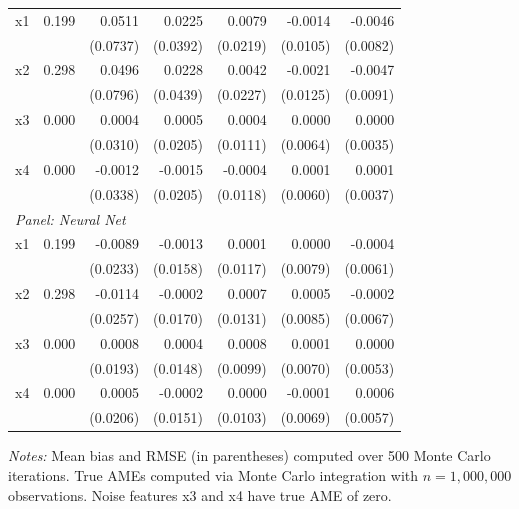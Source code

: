 \begin{table}[htbp]
\begin{threeparttable}
\begin{tabular}{lrrrrrr}
\quad x1 & 0.199 & 0.0511 & 0.0225 & 0.0079 & -0.0014 & -0.0046 \\
 &  & (0.0737) & (0.0392) & (0.0219) & (0.0105) & (0.0082) \\
\quad x2 & 0.298 & 0.0496 & 0.0228 & 0.0042 & -0.0021 & -0.0047 \\
 &  & (0.0796) & (0.0439) & (0.0227) & (0.0125) & (0.0091) \\
\quad x3 & 0.000 & 0.0004 & 0.0005 & 0.0004 & 0.0000 & 0.0000 \\
 &  & (0.0310) & (0.0205) & (0.0111) & (0.0064) & (0.0035) \\
\quad x4 & 0.000 & -0.0012 & -0.0015 & -0.0004 & 0.0001 & 0.0001 \\
 &  & (0.0338) & (0.0205) & (0.0118) & (0.0060) & (0.0037) \\
\midrule
\multicolumn{7}{l}{\textit{Panel: Neural Net}} \\
\quad x1 & 0.199 & -0.0089 & -0.0013 & 0.0001 & 0.0000 & -0.0004 \\
 &  & (0.0233) & (0.0158) & (0.0117) & (0.0079) & (0.0061) \\
\quad x2 & 0.298 & -0.0114 & -0.0002 & 0.0007 & 0.0005 & -0.0002 \\
 &  & (0.0257) & (0.0170) & (0.0131) & (0.0085) & (0.0067) \\
\quad x3 & 0.000 & 0.0008 & 0.0004 & 0.0008 & 0.0001 & 0.0000 \\
 &  & (0.0193) & (0.0148) & (0.0099) & (0.0070) & (0.0053) \\
\quad x4 & 0.000 & 0.0005 & -0.0002 & 0.0000 & -0.0001 & 0.0006 \\
 &  & (0.0206) & (0.0151) & (0.0103) & (0.0069) & (0.0057) \\
\bottomrule
\end{tabular}
\begin{tablenotes}
\footnotesize
\item \textit{Notes:} Mean bias and RMSE (in parentheses) computed over 500 Monte Carlo iterations. True AMEs computed via Monte Carlo integration with $n=1{,}000{,}000$ observations. Noise features x3 and x4 have true AME of zero.
\end{tablenotes}
\end{threeparttable}
\end{table}